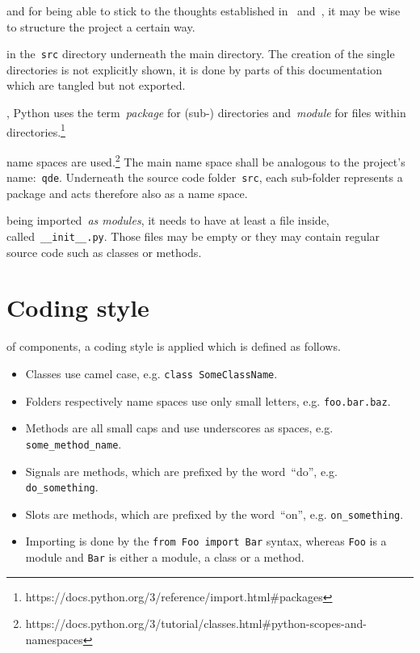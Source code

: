 \documentclass[%
    a4paper,    %
    justified,  %
    nobib,      %
    openany     %
]{tufte-book}
\begin{document}
 and for being able to
stick to the thoughts established in~
and~, it may be wise to structure the project a
certain way.

 in the~\verb+src+ directory
underneath the main directory. The creation of the single directories is not
explicitly shown, it is done by parts of this documentation which are tangled
but not exported.

, Python uses the
term~\emph{package} for (sub-) directories and~\emph{module} for files within
directories.\footnote{https://docs.python.org/3/reference/import.html\#packages}

 name
spaces are
used.\footnote{https://docs.python.org/3/tutorial/classes.html\#python-scopes-and-namespaces}
The main name space shall be analogous to the project's name:~\verb+qde+.
Underneath the source code folder~\verb+src+, each sub-folder represents a
package and acts therefore also as a name space.

 being
imported~\emph{as modules}, it needs to have at least a file inside,
called~\verb+__init__.py+. Those files may be empty or they may contain
regular source code such as classes or methods.

\section{Coding style}
\label{appendix:sec:coding-style}

 of components, a
coding style is applied which is defined as follows.

\begin{itemize}
  \item Classes use camel case, e.g. \verb+class SomeClassName+.
  \item Folders respectively name spaces use only small letters, e.g.
    \verb+foo.bar.baz+.
  \item Methods are all small caps and use underscores as spaces, e.g.
    \verb+some_method_name+.
  \item Signals are methods, which are prefixed by the word~\enquote{do}, e.g.
    \verb+do_something+.
  \item Slots are methods, which are prefixed by the word~\enquote{on}, e.g.
    \verb+on_something+.
  \item Importing is done by the \verb+from Foo import Bar+ syntax, whereas
    \verb+Foo+ is a module and \verb+Bar+ is either a module, a class or a
    method.
\end{itemize}
\end{document}
